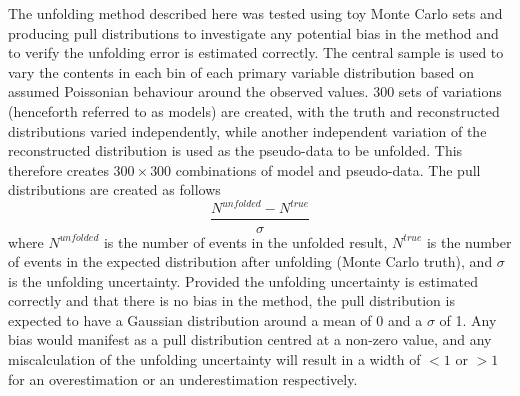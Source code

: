 The unfolding method described here was tested using toy Monte Carlo sets and producing pull distributions to
investigate any potential bias in the method and to verify the unfolding error is estimated correctly. The
central \ttbar \MADGRAPH sample is used to vary the contents in each bin of each primary variable distribution
based on assumed Poissonian behaviour around the observed values. 300 sets of variations (henceforth referred
to as models) are created, with the truth and reconstructed distributions varied independently, while another
independent variation of the reconstructed distribution is used as the pseudo-data to be unfolded. This
therefore creates $300\times300$ combinations of model and pseudo-data. The pull distributions are created as
follows
\begin{equation}
\frac{N^{unfolded}-N^{true}}{\sigma}
\label{eq:pulls}
\end{equation}
where $N^{unfolded}$ is the number of events in the unfolded result, $N^{true}$ is the number of events in the
expected distribution after unfolding (Monte Carlo truth), and $\sigma$ is the unfolding uncertainty. Provided
the unfolding uncertainty is estimated correctly and that there is no bias in the method, the pull
distribution is expected to have a Gaussian distribution around a mean of 0 and a $\sigma$ of 1. Any bias
would manifest as a pull distribution centred at a non-zero value, and any miscalculation of the
unfolding uncertainty will result in a width of $<1$ or $>1$ for an overestimation or an underestimation
respectively.

